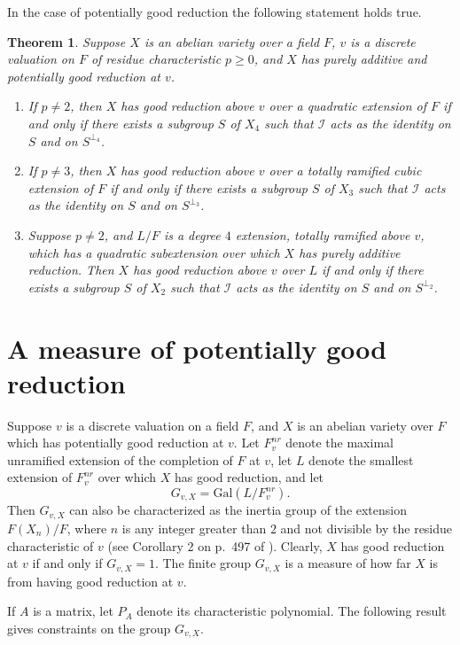 \documentclass{amsart}
\def\Gal{\mathrm{Gal}}
\def\I{{\mathcal I}}
\newtheorem{thm}{Theorem}[section]
\theoremstyle{definition}
\begin{document}
	In the case of potentially good reduction the following statement
holds true.

\begin{thm}
\label{paddcor}
Suppose 
$X$ is an abelian variety over a field $F$,  
$v$ is a discrete valuation on $F$ of residue characteristic 
$p \ge 0$, and $X$ has purely additive and  
potentially good reduction at $v$. 
\begin{enumerate}
\item[(a)] 
If $p \ne 2$, then $X$ has good reduction above $v$ over a quadratic 
extension of $F$ if and only if 
there exists a subgroup $S$ of $X_4$ such 
that $\I$ acts as the identity on $S$ and on $S^{\perp_4}$.
\item[(b)] If $p \ne 3$, 
then $X$ has good reduction above $v$ over a totally ramified cubic
extension of $F$ if and only if 
there exists a subgroup $S$ of $X_3$ such 
that $\I$ acts as the identity on $S$ and on $S^{\perp_3}$.
\item[(c)] Suppose $p \ne 2$, and
$L/F$ is a degree $4$ extension, 
totally ramified above $v$, 
which has a quadratic subextension over which $X$ has purely
additive reduction.  
Then $X$ has good reduction above $v$ over $L$ if and only if 
there exists a subgroup $S$ of $X_2$ such 
that $\I$ acts as the identity on $S$ and on $S^{\perp_2}$.
\end{enumerate}
\end{thm}

\section{A measure of potentially good reduction}
\label{Gsect}

Suppose $v$ is a discrete valuation on a field $F$, and
$X$ is an abelian variety over $F$ which has potentially good 
reduction at $v$. Let $F_{v}^{nr}$ denote the maximal unramified
extension of the completion of $F$ at $v$, let $L$ denote
the smallest extension of $F_{v}^{nr}$ over which $X$ has good
reduction, and let
$$G_{v,X} = \Gal(L/F_{v}^{nr}).$$
Then $G_{v,X}$ can also be characterized as the inertia group of
the extension $F(X_n)/F$, where $n$ is any integer 
greater than $2$ and not divisible by the residue characteristic
of $v$ (see Corollary 2 on p.~497 of \cite{Serre-Tate}).
Clearly, $X$ has good reduction at $v$ if and only if
$G_{v,X} = 1$. The finite group $G_{v,X}$ is a measure of how
far $X$ is from having good reduction at $v$.

If $A$ is a matrix, let $P_A$ denote its characteristic polynomial.
The following result gives constraints on the group $G_{v,X}$.
\end{document}
